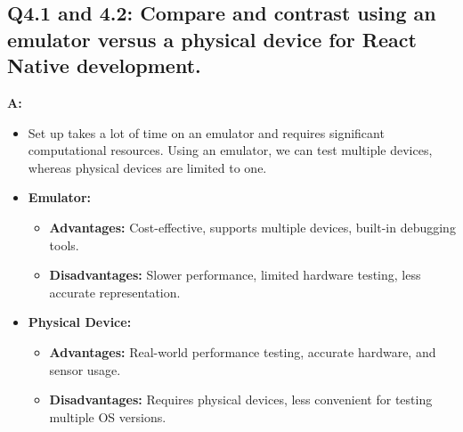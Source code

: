 \documentclass{article}
\begin{document}
\subsection*{Q4.1 and 4.2: Compare and contrast using an emulator versus a physical device for React Native development.}
\textbf{A:}
\begin{itemize}
    \item Set up takes a lot of time on an emulator and requires significant computational resources. Using an emulator, we can test multiple devices, whereas physical devices are limited to one.
    \item \textbf{Emulator:}
    \begin{itemize}
        \item \textbf{Advantages:} Cost-effective, supports multiple devices, built-in debugging tools.
        \item \textbf{Disadvantages:} Slower performance, limited hardware testing, less accurate representation.
    \end{itemize}
    \item \textbf{Physical Device:}
    \begin{itemize}
        \item \textbf{Advantages:} Real-world performance testing, accurate hardware, and sensor usage.
        \item \textbf{Disadvantages:} Requires physical devices, less convenient for testing multiple OS versions.
    \end{itemize}
\end{itemize}
\end{document}
